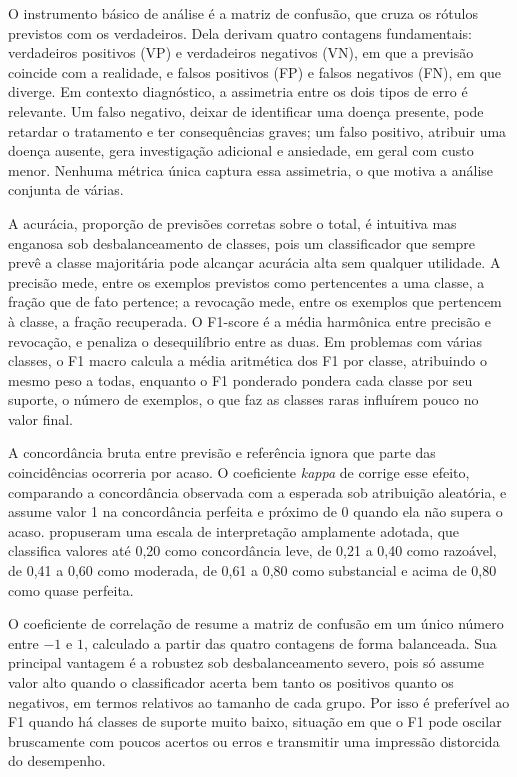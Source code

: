 O instrumento básico de análise é a matriz de confusão, que cruza os rótulos previstos com os verdadeiros. Dela derivam quatro contagens fundamentais: verdadeiros positivos (VP) e verdadeiros negativos (VN), em que a previsão coincide com a realidade, e falsos positivos (FP) e falsos negativos (FN), em que diverge. Em contexto diagnóstico, a assimetria entre os dois tipos de erro é relevante. Um falso negativo, deixar de identificar uma doença presente, pode retardar o tratamento e ter consequências graves; um falso positivo, atribuir uma doença ausente, gera investigação adicional e ansiedade, em geral com custo menor. Nenhuma métrica única captura essa assimetria, o que motiva a análise conjunta de várias.

A acurácia, proporção de previsões corretas sobre o total, é intuitiva mas enganosa sob desbalanceamento de classes, pois um classificador que sempre prevê a classe majoritária pode alcançar acurácia alta sem qualquer utilidade. A precisão mede, entre os exemplos previstos como pertencentes a uma classe, a fração que de fato pertence; a revocação mede, entre os exemplos que pertencem à classe, a fração recuperada. O F1-score é a média harmônica entre precisão e revocação, e penaliza o desequilíbrio entre as duas. Em problemas com várias classes, o F1 macro calcula a média aritmética dos F1 por classe, atribuindo o mesmo peso a todas, enquanto o F1 ponderado pondera cada classe por seu suporte, o número de exemplos, o que faz as classes raras influírem pouco no valor final.

A concordância bruta entre previsão e referência ignora que parte das coincidências ocorreria por acaso. O coeficiente \textit{kappa} de \citet{cohen1960} corrige esse efeito, comparando a concordância observada com a esperada sob atribuição aleatória, e assume valor 1 na concordância perfeita e próximo de 0 quando ela não supera o acaso. \citet{landis_koch1977} propuseram uma escala de interpretação amplamente adotada, que classifica valores até 0,20 como concordância leve, de 0,21 a 0,40 como razoável, de 0,41 a 0,60 como moderada, de 0,61 a 0,80 como substancial e acima de 0,80 como quase perfeita.

O coeficiente de correlação de \citet{matthews1975} resume a matriz de confusão em um único número entre $-1$ e $1$, calculado a partir das quatro contagens de forma balanceada. Sua principal vantagem é a robustez sob desbalanceamento severo, pois só assume valor alto quando o classificador acerta bem tanto os positivos quanto os negativos, em termos relativos ao tamanho de cada grupo. Por isso é preferível ao F1 quando há classes de suporte muito baixo, situação em que o F1 pode oscilar bruscamente com poucos acertos ou erros e transmitir uma impressão distorcida do desempenho.

